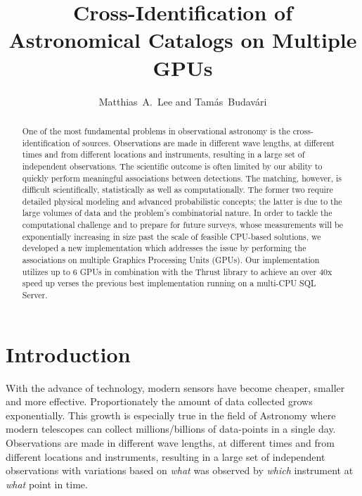 \resetcounters
{}


\title{Cross-Identification of Astronomical Catalogs on Multiple GPUs}
\author{Matthias~A.~Lee and Tam\'as~Budav\'ari
}


\begin{abstract}
One of the most fundamental problems in observational astronomy is the cross-identification of sources. Observations are made in different wave lengths, at different times and from different locations and instruments, resulting in a large set of independent observations. The scientific outcome is often limited by our ability to quickly perform meaningful associations between detections. The matching, however, is difficult scientifically, statistically as well as computationally. The former two require detailed physical modeling and advanced probabilistic concepts; the latter is due to the large volumes of data and the problem's combinatorial nature. In order to tackle the computational challenge and to prepare for future surveys, whose measurements will be exponentially increasing in size past the scale of feasible CPU-based solutions, we developed a new implementation which addresses the issue by performing the associations on multiple Graphics Processing Units (GPUs). Our implementation utilizes up to 6 GPUs in combination with the Thrust library to achieve an over 40x speed up verses the previous best implementation running on a multi-CPU SQL Server.
\end{abstract}


\section{Introduction}
With the advance of technology, modern sensors have become cheaper, smaller and more effective. Proportionately the amount of data collected grows exponentially. This growth is especially true in the field of Astronomy where modern telescopes can collect millions/billions of data-points in a single day. Observations are made in different wave lengths, at different times and from different locations and instruments, resulting in a large set of independent observations with variations based on \textit{what} was observed by \textit{which} instrument at \textit{what} point in time.

